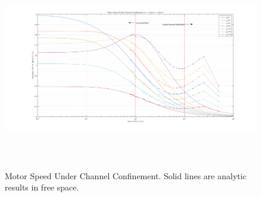 \documentclass[fontsize=11pt, %
                             paper=a4, %
                             twoside, %
                             captions=tableheading,
                             index=totoc,
                             hyperref]{labbook}
\begin{document}
\begin{addmargin}[4cm]{0cm}
\begin{figure}
\centering
\includegraphics[width=\linewidth, height=3.5in]{2016-11-23-AnalyticVerification_Channel.png}
\caption{Motor Speed Under Channel Confinement. Solid lines are analytic results in free space.}\label{2016-11-23-MSUCC}
\end{figure}


\end{addmargin}
\end{document}

